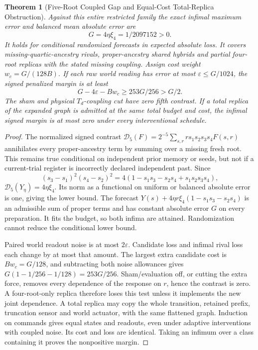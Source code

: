 \documentclass[11pt,a4paper]{article}
\newtheorem{theorem}{Theorem}[section]
\theoremstyle{definition}
\begin{document}
\begin{theorem}[Five-Root Coupled Gap and Equal-Cost Total-Replica Obstruction]
\label{thm:bridge-expanded-identification}
Against this entire restricted family the exact infimal maximum error and
balanced mean absolute error are
\[
 G=4\eta\xi_4=1/2097152>0.
\]
It holds for conditional randomized forecasts in expected absolute loss.
It covers missing-quartic-ancestry rivals, proper-ancestry shared hybrids
and partial four-root replicas with the stated missing coupling. Assign
cost weight $w_c=G/(128B)$. If each raw world reading has error at most
$\varepsilon\le G/1024$, the signed penalized margin is at least
\[
 G-4\varepsilon-Bw_c\ge253G/256>G/2.
\]
The sham and physical $T_d$-coupling cut have zero fifth contrast. If a total
replica of the expanded graph is admitted at the same total budget and cost,
the infimal signed margin is at most zero under every interventional schedule.
\end{theorem}
\begin{proof}
The normalized signed contrast
$\mathcal D_5(F)=2^{-5}\sum_{s,r}rs_1s_2s_3s_4F(s,r)$ annihilates every
proper-ancestry term by summing over a missing fresh root. This remains true
conditional on independent prior memory or seeds, but not if a current-trial
register is incorrectly declared independent past. Since
\[
 (s_3-s_1)^2(s_4-s_2)^2
 =4(1-s_1s_3-s_2s_4+s_1s_2s_3s_4),
\]
$\mathcal D_5(Y_\eta)=4\eta\xi_4$. Its norm as a functional on uniform or
balanced absolute error is one, giving the lower bound. The forecast
$Y(s)+4\eta r\xi_4(1-s_1s_3-s_2s_4)$ is an admissible sum of proper terms
and has constant absolute error $G$ on every preparation. It fits the
budget, so both infima are attained. Randomization cannot reduce the
conditional lower bound.

Paired world readout noise is at most $2\varepsilon$. Candidate loss and
infimal rival loss each change by at most that amount. The largest extra
candidate cost is $Bw_c=G/128$, and subtracting both noise allowances gives
$G(1-1/256-1/128)=253G/256$. Sham/evaluation off, or cutting the extra force,
removes every dependence of the response on $r$, hence the contrast is zero.
A four-root-only replica therefore loses this test unless it implements the
new joint dependence. A total replica may copy the whole transition, retained
prefix, truncation sensor and world actuator, with the same flattened graph.
Induction on commands gives equal states and readouts, even under adaptive
interventions with coupled noise. Its cost and loss are identical. Taking
an infimum over a class containing it proves the nonpositive margin.
\end{proof}
\end{document}
